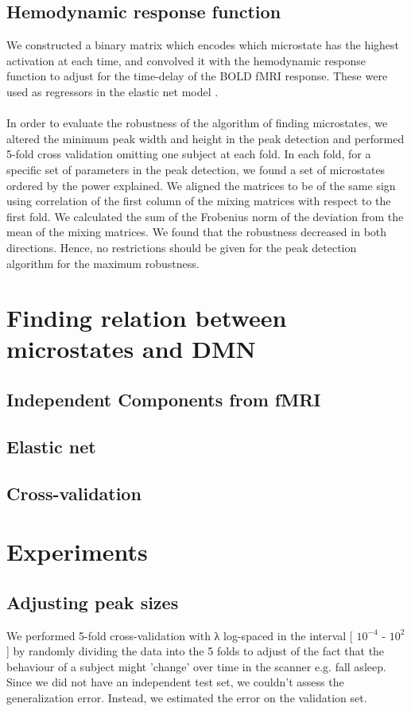\documentclass{article}
\begin{document}
\subsection{Hemodynamic response function}   
We constructed a binary matrix which encodes which microstate has the highest activation at each time, and convolved it with the hemodynamic response function to adjust for the time-delay of the BOLD fMRI response. These were used as regressors in the elastic net model \cite{hastie01}. 
\\ \\
In order to evaluate the robustness of the algorithm of finding microstates, we altered the minimum peak width and height in the peak detection and performed 5-fold cross validation omitting one subject at each fold. In each fold, for a specific set of parameters in the peak detection, we found a set of microstates ordered by the power explained. We aligned the matrices to be of the same sign using correlation of the first column of the mixing matrices with respect to the first fold. We calculated the sum of the Frobenius norm of the deviation from the mean of the mixing matrices. We found that the robustness decreased in both directions. Hence, no restrictions should be given for the peak detection algorithm for the maximum robustness.
\section{Finding relation between microstates and DMN}
\subsection{Independent Components from fMRI}
\subsection{Elastic net}
\subsection{Cross-validation}



\section{Experiments}
\subsection{Adjusting peak sizes}
We performed 5-fold cross-validation with λ log-spaced in the interval 
[ $10^{-4}$ - $10^2$] by randomly dividing the data into the 5 folds to adjust of the fact that the behaviour of a subject might 'change' over time in the scanner 
e.g. fall asleep. Since we did not have an independent test set, we couldn't assess the generalization error. Instead, we estimated the error on the validation set.
\end{document}
